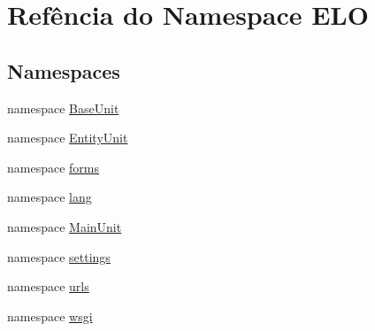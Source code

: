 \hypertarget{namespaceELO}{\section{Refência do Namespace E\-L\-O}
\label{da/d09/namespaceELO}
}
\subsection*{Namespaces}
\begin{DoxyCompactItemize}
\item 
namespace \hyperlink{namespaceELO_1_1BaseUnit}{Base\-Unit}
\item 
namespace \hyperlink{namespaceELO_1_1EntityUnit}{Entity\-Unit}
\item 
namespace \hyperlink{namespaceELO_1_1forms}{forms}
\item 
namespace \hyperlink{namespaceELO_1_1lang}{lang}
\item 
namespace \hyperlink{namespaceELO_1_1MainUnit}{Main\-Unit}
\item 
namespace \hyperlink{namespaceELO_1_1settings}{settings}
\item 
namespace \hyperlink{namespaceELO_1_1urls}{urls}
\item 
namespace \hyperlink{namespaceELO_1_1wsgi}{wsgi}
\end{DoxyCompactItemize}
